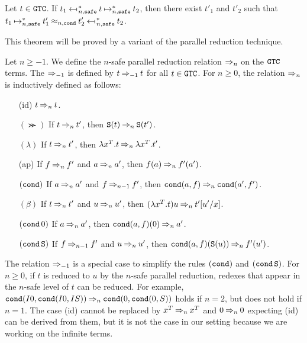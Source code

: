 \begin{theorem}
  Let $t\in {\tt GTC}$.
  If $t_1 \nsafeReducesAstL{n} t \nsafeReducesAst{n} t_2$, 
  then there exist $t'_1$ and $t'_2$ such that
  $t_1 \nsafeReducesAst{n} t'_1 \nequal{n,\cond} t'_2 \nsafeReducesAstL{n} t_2$. 
\end{theorem}

This theorem will be proved by a variant of the parallel reduction technique. 

\begin{definition}
  Let $n\ge -1$.
  We define the $n$-safe parallel reduction relation $\mathbin{\Rightarrow_{n}}$ on the ${\tt GTC}$ terms.
  The $\mathbin{\Rightarrow_{-1}}$ is defined by $t\mathbin{\Rightarrow_{-1}} t$ for all $t\in{\tt GTC}$. 
  For $n\ge 0$, the relation $\mathbin{\Rightarrow_{n}}$ is inductively defined as follows: 
  \begin{itemize}
  \item[(id)]
    $t \mathbin{\Rightarrow_{n}} t$.
  \item[$(\Succ)$]
    If $t \mathbin{\Rightarrow_{n}} t'$, then ${\tt S}(t) \mathbin{\Rightarrow_{n}} {\tt S}(t')$.
  \item[$(\lambda)$]
    If $t \mathbin{\Rightarrow_{n}} t'$, then $\lambda x^T.t \mathbin{\Rightarrow_{n}} \lambda x^T.t'$.
  \item[(ap)]
    If $f \mathbin{\Rightarrow_{n}} f'$ and $a \mathbin{\Rightarrow_{n}} a'$,
    then $f(a) \mathbin{\Rightarrow_{n}} f'(a')$.
  \item[$({\tt cond})$]
    If $a \mathbin{\Rightarrow_{n}} a'$ and $f \mathbin{\Rightarrow_{n-1}} f'$,
    then ${\tt cond}(a,f) \mathbin{\Rightarrow_{n}} {\tt cond}(a',f')$.
  \item[$(\beta)$]
    If $t \mathbin{\Rightarrow_{n}} t'$ and $u \mathbin{\Rightarrow_{n}} u'$,
    then $(\lambda x^T.t)u \mathbin{\Rightarrow_{n}} t'[u'/x]$.
  \item[$({\tt cond}\,0)$]
    If $a \mathbin{\Rightarrow_{n}} a'$, 
    then ${\tt cond}(a,f)(0) \mathbin{\Rightarrow_{n}} a'$.
  \item[$({\tt cond}\,{\tt S})$]
    If $f \mathbin{\Rightarrow_{n-1}} f'$ and $u \mathbin{\Rightarrow_{n}} u'$, 
    then ${\tt cond}(a,f)({\tt S}(u)) \mathbin{\Rightarrow_{n}} f'(u')$.
  \end{itemize}
\end{definition}

The relation $\mathbin{\Rightarrow_{-1}}$ is a special case to simplify
the rules $({\tt cond})$ and $({\tt cond}\,{\tt S})$.
For $n\ge 0$, if $t$ is reduced to $u$ by the $n$-safe parallel reduction,
redexes that appear in the $n$-safe level of $t$ can be reduced. 
For example, ${\tt cond}(I0,{\tt cond}(I0,IS)) \mathbin{\Rightarrow_{n}} {\tt cond}(0,{\tt cond}(0,S))$
holds if $n=2$, but does not hold if $n=1$. 
The case (id) cannot be replaced by $x^T \mathbin{\Rightarrow_{n}} x^T$ and $0 \mathbin{\Rightarrow_{n}} 0$ expecting (id) can be derived from them, but it is not the case in our setting
because we are working on the infinite terms. 

